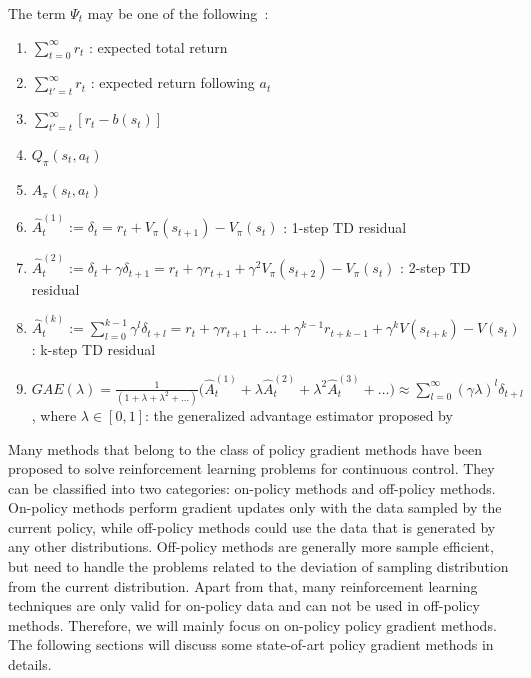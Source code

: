 The term $\Psi_t$ may be one of the following~\cite{schulman2015high}:
\begin{enumerate}
    \item $\sum_{t=0}^{\infty} r_t$  : expected total return
    \item $\sum_{t'=t}^{\infty} r_t$  : expected return following $a_t$
    \item $\sum_{t'=t}^{\infty} [r_t - b(s_t)]$
    \item $Q_\pi (s_t, a_t)$
    \item $A_\pi (s_t, a_t)$
    \item $ \hat{A}_t^{(1)}:=  \delta_t = r_t + V_\pi (s_{t+1}) - V_\pi (s_{t})$ : 1-step TD residual
    \item $ \hat{A}_t^{(2)} :=  \delta_t + \gamma \delta_{t+1}= r_t +\gamma r_{t+1} + \gamma^2 V_\pi (s_{t+2}) - V_\pi (s_{t})$ : 2-step TD residual
    \item $\hat{A}_t^{(k)} := \sum_{l=0}^{k-1} \gamma^{l} \delta_{t+l} =   r_t + \gamma r_{t+1} + \dots + \gamma^{k-1} r_{t+k-1} + \gamma^{k} V(s_{t+k}) -V(s_t)$ : k-step TD residual
    \item $GAE(\lambda) = \frac{1}{(1+\lambda+\lambda^2+\dots)} \big(\hat{A}_t^{(1)} + \lambda \hat{A}_t^{(2)}+ \lambda^2 \hat{A}_t^{(3)} +\dots \big) 
    \approx \sum_{l=0}^{\infty} (\gamma \lambda)^l \delta_{t+l}$ , where $\lambda \in [0,1]$: the generalized advantage estimator proposed by \cite{schulman2015high}
\end{enumerate}
Many methods that belong to the class of policy gradient methods have been proposed to solve reinforcement learning problems for continuous control. They can be classified into two categories: on-policy methods and off-policy methods. On-policy methods perform gradient updates only with the data sampled by the current policy, while off-policy methods could use the data that is generated by any other distributions. Off-policy methods are generally more sample efficient, but need to handle the problems related to the deviation of sampling distribution from the current distribution. Apart from that, many reinforcement learning techniques are only valid for on-policy data and can not be used in off-policy methods. Therefore, we will mainly focus on on-policy policy gradient methods. The following sections will discuss some state-of-art policy gradient methods in details.
